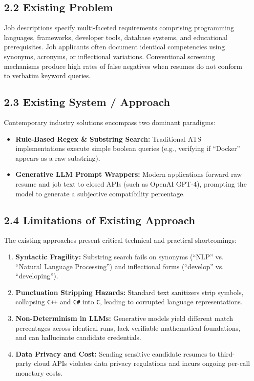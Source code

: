 \documentclass[11pt,a4paper]{article}
\begin{document}
\subsection{2.2 Existing Problem}
Job descriptions specify multi-faceted requirements comprising programming languages, frameworks, developer tools, database systems, and educational prerequisites. Job applicants often document identical competencies using synonyms, acronyms, or inflectional variations. Conventional screening mechanisms produce high rates of false negatives when resumes do not conform to verbatim keyword queries.

\subsection{2.3 Existing System / Approach}
Contemporary industry solutions encompass two dominant paradigms:
\begin{itemize}[noitemsep]
    \item \textbf{Rule-Based Regex \& Substring Search:} Traditional ATS implementations execute simple boolean queries (e.g., verifying if ``Docker'' appears as a raw substring).
    \item \textbf{Generative LLM Prompt Wrappers:} Modern applications forward raw resume and job text to closed APIs (such as OpenAI GPT-4), prompting the model to generate a subjective compatibility percentage.
\end{itemize}

\subsection{2.4 Limitations of Existing Approach}
The existing approaches present critical technical and practical shortcomings:
\begin{enumerate}[noitemsep]
    \item \textbf{Syntactic Fragility:} Substring search fails on synonyms (``NLP'' vs. ``Natural Language Processing'') and inflectional forms (``develop'' vs. ``developing'').
    \item \textbf{Punctuation Stripping Hazards:} Standard text sanitizers strip symbols, collapsing \texttt{C++} and \texttt{C\#} into \texttt{C}, leading to corrupted language representations.
    \item \textbf{Non-Determinism in LLMs:} Generative models yield different match percentages across identical runs, lack verifiable mathematical foundations, and can hallucinate candidate credentials.
    \item \textbf{Data Privacy and Cost:} Sending sensitive candidate resumes to third-party cloud APIs violates data privacy regulations and incurs ongoing per-call monetary costs.
\end{enumerate}
\end{document}
